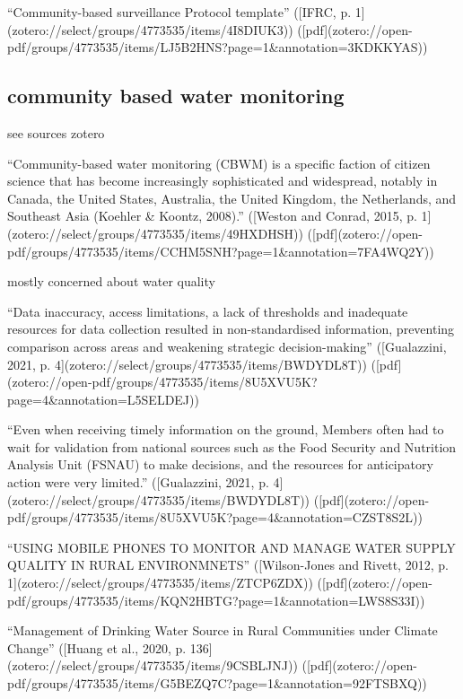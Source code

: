 {“Community-based surveillance Protocol template” ([IFRC, p. 1](zotero://select/groups/4773535/items/4I8DIUK3)) ([pdf](zotero://open-pdf/groups/4773535/items/LJ5B2HNS?page=1&annotation=3KDKKYAS))



\subsection{community based water monitoring}
see sources zotero

“Community-based water monitoring (CBWM) is a specific faction of citizen science that has become increasingly sophisticated and widespread, notably in Canada, the United States, Australia, the United Kingdom, the Netherlands, and Southeast Asia (Koehler & Koontz, 2008).” ([Weston and Conrad, 2015, p. 1](zotero://select/groups/4773535/items/49HXDHSH)) ([pdf](zotero://open-pdf/groups/4773535/items/CCHM5SNH?page=1&annotation=7FA4WQ2Y))

mostly concerned about water quality

“Data inaccuracy, access limitations, a lack of thresholds and inadequate resources for data collection resulted in non-standardised information, preventing comparison across areas and weakening strategic decision-making” ([Gualazzini, 2021, p. 4](zotero://select/groups/4773535/items/BWDYDL8T)) ([pdf](zotero://open-pdf/groups/4773535/items/8U5XVU5K?page=4&annotation=L5SELDEJ))

“Even when receiving timely information on the ground, Members often had to wait for validation from national sources such as the Food Security and Nutrition Analysis Unit (FSNAU) to make decisions, and the resources for anticipatory action were very limited.” ([Gualazzini, 2021, p. 4](zotero://select/groups/4773535/items/BWDYDL8T)) ([pdf](zotero://open-pdf/groups/4773535/items/8U5XVU5K?page=4&annotation=CZST8S2L))

“USING MOBILE PHONES TO MONITOR AND MANAGE WATER SUPPLY QUALITY IN RURAL ENVIRONMNETS” ([Wilson-Jones and Rivett, 2012, p. 1](zotero://select/groups/4773535/items/ZTCP6ZDX)) ([pdf](zotero://open-pdf/groups/4773535/items/KQN2HBTG?page=1&annotation=LWS8S33I))

“Management of Drinking Water Source in Rural Communities under Climate Change” ([Huang et al., 2020, p. 136](zotero://select/groups/4773535/items/9CSBLJNJ)) ([pdf](zotero://open-pdf/groups/4773535/items/G5BEZQ7C?page=1&annotation=92FTSBXQ))




}
